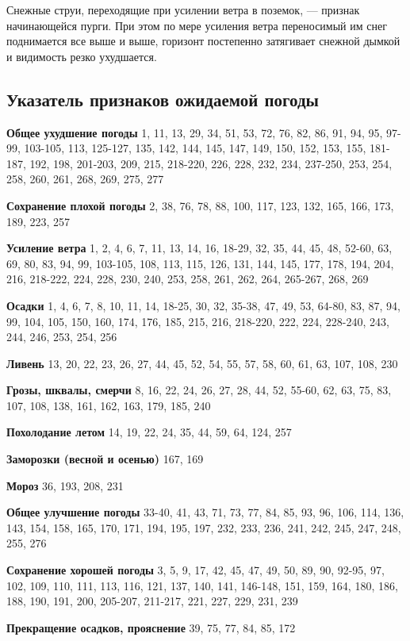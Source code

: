 Снежные струи, переходящие при усилении ветра в поземок, — признак начинающейся пурги. При этом по мере усиления ветра переносимый им снег поднимается все выше и выше, горизонт постепенно затягивает снежной дымкой и видимость резко ухудшается.

\subsection{Указатель признаков ожидаемой погоды}
\textbf{Общее ухудшение погоды} 1, 11, 13, 29, 34, 51, 53, 72, 76, 82, 86, 91, 94, 95, 97-99, 103-105, 113, 125-127, 135, 142, 144, 145, 147, 149, 150, 152, 153, 155, 181-187, 192, 198, 201-203, 209, 215, 218-220, 226, 228, 232, 234, 237-250, 253, 254, 258, 260, 261, 268, 269, 275, 277

\textbf{Сохранение плохой погоды} 2, 38, 76, 78, 88, 100, 117, 123,
132, 165, 166, 173, 189, 223, 257

\textbf{Усиление ветра} 1, 2, 4, 6, 7, 11, 13, 14, 16, 18-29, 32, 35,
44, 45, 48, 52-60, 63, 69, 80, 83, 94, 99, 103-105, 108, 113, 115,
126, 131, 144, 145, 177, 178, 194, 204, 216, 218-222, 224, 228, 230,
240, 253, 258, 261, 262, 264, 265-267, 268, 269

\textbf{Осадки} 1, 4, 6, 7, 8, 10, 11, 14, 18-25, 30, 32, 35-38, 47,
49, 53, 64-80, 83, 87, 94, 99, 104, 105, 150, 160, 174, 176, 185, 215,
216, 218-220, 222, 224, 228-240, 243, 244, 246, 253, 254, 256

\textbf{Ливень} 13, 20, 22, 23, 26, 27, 44, 45, 52, 54, 55, 57, 58,
60, 61, 63, 107, 108, 230

\textbf{Грозы, шквалы, смерчи} 8, 16, 22, 24, 26, 27, 28, 44, 52,
55-60, 62, 63, 75, 83, 107, 108, 138, 161, 162, 163, 179, 185, 240

\textbf{Похолодание летом} 14, 19, 22, 24, 35, 44, 59, 64, 124, 257

\textbf{Заморозки (весной и осенью)} 167, 169

\textbf{Мороз} 36, 193, 208, 231

\textbf{Общее улучшение погоды} 33-40, 41, 43, 71, 73, 77, 84, 85, 93,
96, 106, 114, 136, 143, 154, 158, 165, 170, 171, 194, 195, 197, 232,
233, 236, 241, 242, 245, 247, 248, 255, 276

\textbf{Сохранение хорошей погоды} 3, 5, 9, 17, 42, 45, 47, 49, 50,
89, 90, 92-95, 97, 102, 109, 110, 111, 113, 116, 121, 137, 140, 141,
146-148, 151, 159, 164, 180, 186, 188, 190, 191, 200, 205-207,
211-217, 221, 227, 229, 231, 239

\textbf{Прекращение осадков, прояснение} 39, 75, 77, 84, 85, 172

